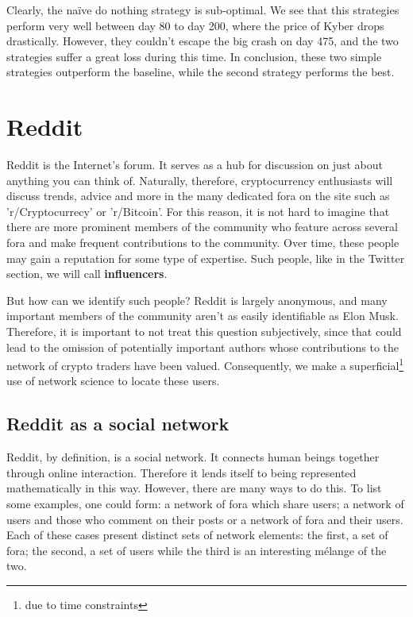 \documentclass[twoside]{report}
\begin{document}
\begin{spacing}{1}
Clearly, the naïve do nothing strategy is sub-optimal. We see that this strategies perform very well between day 80 to day 200, where the price of Kyber drops drastically. However, they couldn't escape the big crash on day 475, and the two strategies suffer a great loss during this time. In conclusion, these two simple strategies outperform the baseline, while the second strategy performs the best.

\section{Reddit}\label{reddit}
Reddit is the Internet's forum. It serves as a hub for discussion on just about anything you can think of. Naturally, therefore, cryptocurrency enthusiasts will discuss trends, advice and more in the many dedicated fora on the site such as 'r/Cryptocurrecy' or 'r/Bitcoin'. For this reason, it is not hard to imagine that there are more prominent members of the community who feature across several fora and make frequent contributions to the community. Over time, these people may gain a reputation for some type of expertise. Such people, like in the Twitter section, we will call  \textbf{influencers}. 

But how can we identify such people? Reddit is largely anonymous, and many important members of the community aren't as easily identifiable as Elon Musk. Therefore, it is important to not treat this question subjectively, since that could lead to the omission of potentially important authors whose contributions to the network of crypto traders have been valued. Consequently, we make a superficial\footnote{due to time constraints} use of network science to locate these users. 

\subsection{Reddit as a social network}\label{sec:redditSN}

Reddit, by definition, is a social network. It connects human beings together through online interaction. Therefore it lends itself to being represented mathematically in this way. However, there are many ways to do this. To list some examples, one could form: a network of fora which share users; a network of users and those who comment on their posts or a network of fora and their users. Each of these cases present distinct sets of network elements: the first, a set of fora; the second, a set of users while the third is an interesting mélange of the two. 


\end{spacing}
\end{document}
